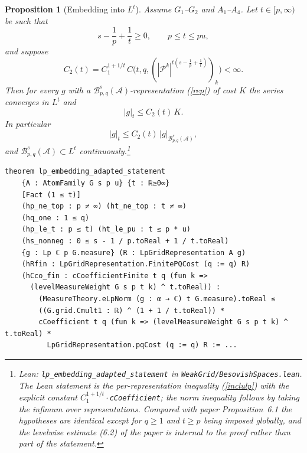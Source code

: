 \documentclass[11pt]{amsart}
\newtheorem{proposition}[theorem]{Proposition}
\theoremstyle{definition}
\newcommand{\lean}[1]{\texttt{#1}}
\begin{document}
\begin{proposition}[Embedding into $L^t$]\label{lp}
Assume $G_1$--$G_2$ and $A_1$--$A_4$. Let $t \in [p,\infty)$ be such that
\begin{equation}\label{c11} s-\frac{1}{p}+\frac{1}{t} \geq 0, \qquad p \leq t \leq pu,\end{equation}
and suppose
\begin{equation}\label{decay} C_{2}(t)= C_1^{1+1/t}\, C\big(t,q,(|\mathcal{P}^k|^{t(s-\frac1p+\frac1t)})_k\big) < \infty.\end{equation}
Then for every $g$ with a $\mathcal{B}^s_{p,q}(\mathcal{A})$-representation
(\ref{rep}) of cost $K$ the series converges in $L^t$ and
\begin{equation}\label{inclulp} |g|_{t} \leq C_2(t)\, K.\end{equation}
In particular
$$|g|_t \leq C_2(t)\, |g|_{\mathcal{B}^s_{p,q}(\mathcal{A})},$$
and $\mathcal{B}^s_{p,q}(\mathcal{A}) \subset L^t$
continuously.\footnote{Lean: \lean{lp\_embedding\_adapted\_statement} in
\lean{WeakGrid/BesovishSpaces.lean}. The Lean statement is the
per-representation inequality (\ref{inclulp}) with the explicit constant
$C_1^{1+1/t}\cdot$\lean{cCoefficient}; the norm inequality follows by taking
the infimum over representations. Compared with paper Proposition~6.1 the
hypotheses are identical except for $q \geq 1$ and $t \geq p$ being imposed
globally, and the levelwise estimate (6.2) of the paper is internal to the
proof rather than part of the statement.}
\end{proposition}
\begin{lstlisting}[style=lean]
theorem lp_embedding_adapted_statement
    {A : AtomFamily G s p u} {t : ℝ≥0∞}
    [Fact (1 ≤ t)]
    (hp_ne_top : p ≠ ∞) (ht_ne_top : t ≠ ∞)
    (hq_one : 1 ≤ q)
    (hp_le_t : p ≤ t) (ht_le_pu : t ≤ p * u)
    (hs_nonneg : 0 ≤ s - 1 / p.toReal + 1 / t.toReal)
    {g : Lp ℂ p G.measure} (R : LpGridRepresentation A g)
    (hRfin : LpGridRepresentation.FinitePQCost (q := q) R)
    (hCco_fin : cCoefficientFinite t q (fun k =>
      (levelMeasureWeight G s p t k) ^ t.toReal)) :
        (MeasureTheory.eLpNorm (g : α → ℂ) t G.measure).toReal ≤
        ((G.grid.Cmult1 : ℝ) ^ (1 + 1 / t.toReal)) *
        cCoefficient t q (fun k => (levelMeasureWeight G s p t k) ^ t.toReal) *
          LpGridRepresentation.pqCost (q := q) R := ...
\end{lstlisting}
\end{document}
